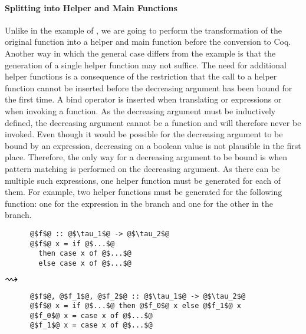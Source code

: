 \paragraph{Splitting into Helper and Main Functions}
Unlike in the example of , we are going to perform the transformation of the original function into a helper and main function before the conversion to Coq.
Another way in which the general case differs from the example is that the generation of a single helper function may not suffice.
The need for additional helper functions is a consequence of the restriction that the call to a helper function cannot be inserted before the decreasing argument has been bound for the first time.
A bind operator is inserted when translating  or  expressions or when invoking a function.
As the decreasing argument must be inductively defined, the decreasing argument cannot be a function and will therefore never be invoked.
Even though it would be possible for the decreasing argument to be bound by an  expression, decreasing on a boolean value is not plausible in the first place.
Therefore, the only way for a decreasing argument to be bound is when pattern matching is performed on the decreasing argument.
As there can be multiple such  expressions, one helper function must be generated for each of them.
For example, two helper functions must be generated for the following function: one for the  expression in the  branch and one for the other in the  branch.

\begin{center}
  \begin{minipage}[t]{0.3\textwidth}
    \begin{verbatim}
      @$f$@ :: @$\tau_1$@ -> @$\tau_2$@
      @$f$@ x = if @$...$@
        then case x of @$...$@
        else case x of @$...$@
    \end{verbatim}
  \end{minipage}
  \begin{minipage}[c]{0.1\textwidth}
    $\mathlarger{\mathlarger{\mathlarger{\rightsquigarrow}}}$
  \end{minipage}
  \begin{minipage}[t]{0.35\textwidth}
    \begin{verbatim}
      @$f$@, @$f_1$@, @$f_2$@ :: @$\tau_1$@ -> @$\tau_2$@
      @$f$@ x = if @$...$@ then @$f_0$@ x else @$f_1$@ x
      @$f_0$@ x = case x of @$...$@
      @$f_1$@ x = case x of @$...$@
    \end{verbatim}
  \end{minipage}
\end{center}


